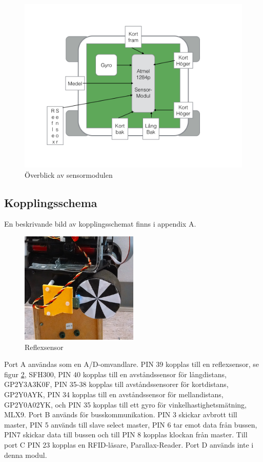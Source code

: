 \documentclass[a4paper,12pt,fleqn]{article}
\begin{document}
\begin{figure}[htp] %
  \begin{center}
  \includegraphics[keepaspectratio=true,width=0.5\linewidth]{bilder/overblicksensor}  %
  \end{center}
  \caption{Överblick av sensormodulen} %
  \label{fig:sensoroverview}
\end{figure}

\subsection{Kopplingsschema}

En beskrivande bild av kopplingsschemat finns i appendix A.

\begin{figure}[htp] %
  \begin{center}
  \includegraphics[keepaspectratio=true,width=0.5\textwidth]{../Kappa/reflexsensor.png}  %
  \end{center}
  \caption{Reflexsensor} %
  \label{fig:reflex} %
\end{figure}

Port A användas som en A/D-omvandlare. PIN 39 kopplas till en reflexsensor, se figur \ref{fig:reflex}, SFH300, PIN 40 kopplas till en avståndssensor för långdistans, GP\-2Y\-3A\-3K\-0F, PIN 35-38 kopplas till avståndssensorer för kortdistans, GP\-2Y\-0A\-YK, 
PIN 34 kopplas till en avståndssensor för mellandistans, GP2Y0A02YK, och PIN 35 kopplas till ett gyro för vinkelhastighetsmätning, ML\-X9. Port B används för busskommunikation. PIN 3 skickar avbrott till master, PIN 5 används till slave select master, PIN 6 tar emot data från bussen, PIN7 skickar data till bussen och till PIN 8 kopplas klockan från master. Till port C PIN 23 kopplas en RFID-läsare, Parallax-Reader. Port D används inte i denna modul. 
\end{document}
